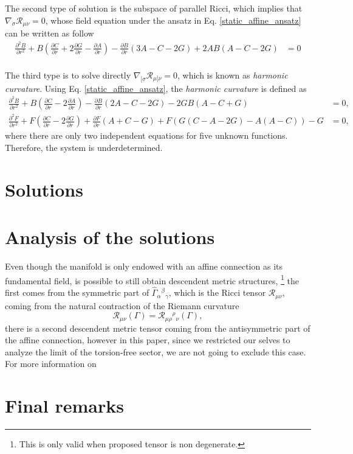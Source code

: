 \documentclass{article}
\begin{document}
The second type of solution is the subspace of parallel Ricci, which
implies that $\nabla_{\sigma}\mathcal{R}_{\mu\nu} = 0$, whose field 
equation under the ansatz in Eq. \eqref{static_affine_ansatz} can be
written as follow
\begin{align}
    \frac{\partial^2 B}{\partial r^2} + B\left(\frac{\partial C}{\partial r} + 2\frac{\partial G}{\partial r} - \frac{\partial A}{\partial r}\right) -\frac{\partial B}{\partial r}\left(3A - C - 2G\right)
    + 2AB\left(A - C - 2G\right) & = 0 \\
\end{align}

The third type is to solve directly $\nabla_{[\sigma}\mathcal{R}_{\mu]\nu} = 0$,
which is known as \textit{harmonic curvature}. Using Eq. \eqref{static_affine_ansatz}, 
the \textit{harmonic curvature} is defined as
\begin{align}
    \frac{\partial^2 B}{\partial r^2} + B\left(\frac{\partial C}{\partial r} -2\frac{\partial A}{\partial r}\right) - \frac{\partial B}{\partial r}\left(2A - C - 2G\right)  - 2GB\left(A - C + G\right)  & = 0, \\
    \frac{\partial^2 F}{\partial r^2}  + F\left(\frac{\partial C}{\partial r} - 2\frac{\partial G}{\partial r}\right) + \frac{\partial F}{\partial r}\left(A + C - G\right) +
    F\left(G \left(C - A -2G\right) - A\left(A - C\right)\right) - G & = 0,
\end{align}
where there are only two independent equations for five unknown 
functions. Therefore, the system is underdetermined.


\section{Solutions}
\label{sec:solutions}




\section{Analysis of the solutions}

Even though the manifold is only endowed with an affine connection as its 
fundamental field, is possible to still obtain descendent metric structures,
\footnote{ This is only valid when proposed tensor is non degenerate.} 
the first comes from the symmetric part of $\hat{\Gamma}_{\alpha}{}^{\beta}{}_{\gamma}$, 
which is the Ricci tensor $\mathcal{R}_{\mu\nu}$, coming from the natural 
contraction of the Riemann curvature
\begin{equation}
    \label{ricci}
    \mathcal{R}_{\mu\nu}\left(\Gamma\right) = \mathcal{R}_{\mu\rho}{}^{\rho}{}_{\nu}\left(\Gamma\right),
\end{equation}
there is a second descendent metric tensor coming from the antisymmetric 
part of the affine connection, however in this paper, since we restricted
our selves to analyze the limit of the torsion-free sector, we are not
going to exclude this case. For more information on 


\section{Final remarks}
\label{sec:final_remarks}



\end{document}
